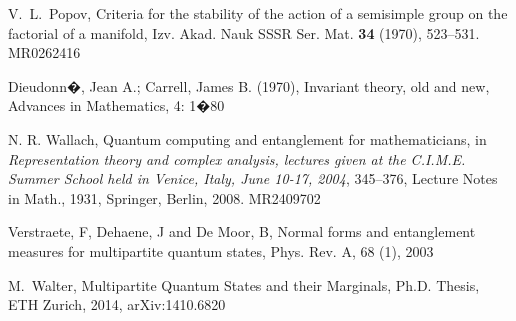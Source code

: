 \documentclass[12pt]{article}
\theoremstyle{definition}
\begin{document}
\begin{thebibliography}{AAAA}
V.~L.~Popov, Criteria for the stability of the action of a semisimple
group on the factorial of a manifold, Izv. Akad. Nauk SSSR Ser.
Mat. {\bf 34} (1970), 523--531. MR0262416

Dieudonn�, Jean A.; Carrell, James B. (1970), Invariant theory, old and new, Advances in Mathematics, 4: 1�80


N. R. Wallach, Quantum computing and entanglement for mathematicians, in
{\it Representation theory and complex analysis, lectures given
at the C.I.M.E.  Summer School held in Venice, Italy, June 10-17, 2004},
345--376, Lecture Notes in Math., 1931, Springer, Berlin, 2008. MR2409702

Verstraete, F, Dehaene, J and De Moor, B,  Normal forms and entanglement measures for multipartite quantum states, Phys. Rev. A, 68 (1), 2003

M.~Walter, Multipartite Quantum States and their Marginals, Ph.D.
Thesis, ETH Zurich, 2014, arXiv:1410.6820

\end{thebibliography}
\end{document}
